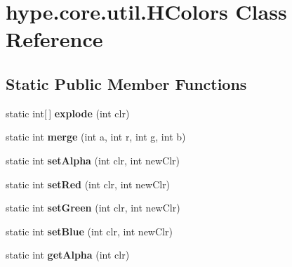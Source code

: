 \hypertarget{classhype_1_1core_1_1util_1_1_h_colors}{\section{hype.\-core.\-util.\-H\-Colors Class Reference}
\label{classhype_1_1core_1_1util_1_1_h_colors}
}
\subsection*{Static Public Member Functions}
\begin{DoxyCompactItemize}
\item 
\hypertarget{classhype_1_1core_1_1util_1_1_h_colors_aef1d1dd5fa96b92704e0ec018dbe18a4}{static int\mbox{[}$\,$\mbox{]} {\bfseries explode} (int clr)}\label{classhype_1_1core_1_1util_1_1_h_colors_aef1d1dd5fa96b92704e0ec018dbe18a4}

\item 
\hypertarget{classhype_1_1core_1_1util_1_1_h_colors_a4d5b86639901a8fefb06f217a6bb0a67}{static int {\bfseries merge} (int a, int r, int g, int b)}\label{classhype_1_1core_1_1util_1_1_h_colors_a4d5b86639901a8fefb06f217a6bb0a67}

\item 
\hypertarget{classhype_1_1core_1_1util_1_1_h_colors_a9bfc91b7ebb8c1300087975915666dc7}{static int {\bfseries set\-Alpha} (int clr, int new\-Clr)}\label{classhype_1_1core_1_1util_1_1_h_colors_a9bfc91b7ebb8c1300087975915666dc7}

\item 
\hypertarget{classhype_1_1core_1_1util_1_1_h_colors_a3f9654e04c93e21f2fdac34f06764a02}{static int {\bfseries set\-Red} (int clr, int new\-Clr)}\label{classhype_1_1core_1_1util_1_1_h_colors_a3f9654e04c93e21f2fdac34f06764a02}

\item 
\hypertarget{classhype_1_1core_1_1util_1_1_h_colors_a85510120afd90433d7de37b8c178ad89}{static int {\bfseries set\-Green} (int clr, int new\-Clr)}\label{classhype_1_1core_1_1util_1_1_h_colors_a85510120afd90433d7de37b8c178ad89}

\item 
\hypertarget{classhype_1_1core_1_1util_1_1_h_colors_ab89a59c303631f022792144a5846124b}{static int {\bfseries set\-Blue} (int clr, int new\-Clr)}\label{classhype_1_1core_1_1util_1_1_h_colors_ab89a59c303631f022792144a5846124b}

\item 
\hypertarget{classhype_1_1core_1_1util_1_1_h_colors_a57e879bfafe888a80cd50d2c63f0606f}{static int {\bfseries get\-Alpha} (int clr)}\label{classhype_1_1core_1_1util_1_1_h_colors_a57e879bfafe888a80cd50d2c63f0606f}


\end{DoxyCompactItemize}
